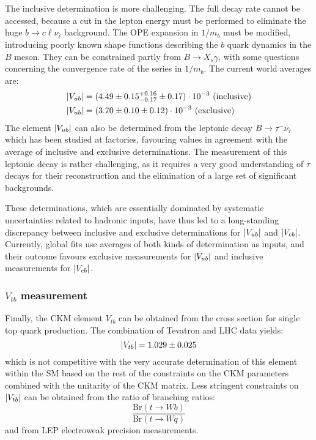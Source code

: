 \documentclass[../../main/main.tex]{subfiles}
\begin{document}
The inclusive determination is more challenging. The full decay rate cannot be accessed, because a cut in the lepton energy must be performed to eliminate the huge \( b \rightarrow c \ell \nu_{\bar{\ell}} \) background. The OPE expansion in \( 1/m_b \) must be modified, introducing poorly known shape functions describing the \( b \) quark dynamics in the \( B \) meson. They can be constrained partly from \( B \rightarrow X_s \gamma \), with some questions concerning the convergence rate of the series in \( 1/m_b \). The current world averages are:
\begin{align}
	\abs{V_{ub}} &= (4.49 \pm 0.15^{+0.16}_{-0.17} \pm 0.17) \cdot 10^{-3} \ \text{(inclusive)}	\\
	\abs{V_{ub}} &= (3.70 \pm 0.10 \pm 0.12) \cdot 10^{-3} \ \text{(exclusive)}
\end{align}
The element \( \abs{V_{ub}} \) can also be determined from the leptonic decay \( B \rightarrow \tau^- \nu_{\bar{\tau}} \) which has been studied at factories, favouring values in agreement with the average of inclusive and exclusive determinations. The measurement of this leptonic decay is rather challenging, as it requires a very good understanding of \( \tau \) decays for their reconstruction and the elimination of a large set of significant backgrounds.

These determinations, which are essentially dominated by systematic uncertainties related to hadronic inputs, have thus led to a long-standing discrepancy between inclusive and exclusive determinations for \( \abs{V_{ub}} \) and \( \abs{V_{cb}} \). Currently, global fits use averages of both kinds of determination as inputs, and their outcome favours exclusive measurements for \( \abs{V_{ub}} \) and inclusive measurements for \( \abs{V_{cb}} \).


\subsubsection*{\( V_{tb} \) measurement}
Finally, the CKM element \( V_{tb} \) can be obtained from the cross section for single top quark production. The combination of Tevatron and LHC data yields:
\begin{equation}
	\abs{V_{tb}}
	=
	1.029 \pm 0.025
	\label{eq:}
\end{equation}
which is not competitive with the very accurate determination of this element within the SM based on the rest of the constraints on the CKM parameters combined with the unitarity of the CKM matrix. Less stringent constraints on \( \abs{V_{tb}} \) can be obtained from the ratio of branching ratios:
\begin{equation}
	\frac{\text{Br}(t \rightarrow W b)}{\text{Br}(t \rightarrow W q)}
	\label{eq:}
\end{equation}
and from LEP electroweak precision measurements.
\end{document}
